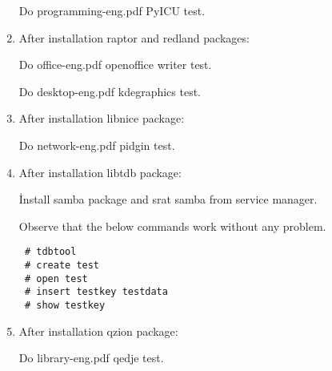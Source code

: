 \documentclass[a4paper,10pt]{article}
\begin{document}
\begin{enumerate}
Do programming-eng.pdf PyICU test.

\item After installation raptor and redland packages:

Do office-eng.pdf openoffice writer test.

Do desktop-eng.pdf kdegraphics test.

\item After installation libnice package:

Do network-eng.pdf pidgin test.

\item After installation libtdb package:

İnstall samba package and srat samba from service manager.

Observe that the below commands work without any problem.
\begin{verbatim}
 # tdbtool
 # create test
 # open test 
 # insert testkey testdata
 # show testkey
\end{verbatim}
\item After installation qzion package:

Do library-eng.pdf qedje test.

\end{enumerate}
\end{document}
